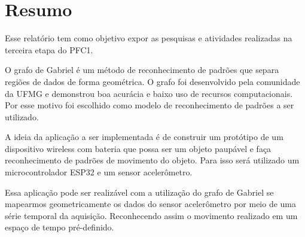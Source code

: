 \section{Resumo}

Esse relatório tem como objetivo expor as pesquisas e atividades realizadas na terceira etapa do PFC1.

O grafo de Gabriel\cite{GabrielGraph1} é um método de reconhecimento de padrões que separa regiões de dados de forma geométrica. O grafo foi 
desenvolvido pela comunidade da UFMG e demonstrou boa acurácia e baixo uso de recursos computacionais.
Por esse motivo foi escolhido como modelo de reconhecimento de padrões a ser utilizado.

A ideia da aplicação a ser implementada é de construir um protótipo de um dispositivo wireless com bateria que possa 
ser um objeto paupável e faça reconhecimento de padrões de movimento do objeto. Para isso será utilizado um microcontrolador ESP32 
e um sensor acelerômetro.

Essa aplicação pode ser realizável com a utilização do grafo de Gabriel se mapearmos geometricamente os dados do sensor acelerômetro por meio de uma
série temporal da aquisição. Reconhecendo assim o movimento realizado em um espaço de tempo pré-definido.
